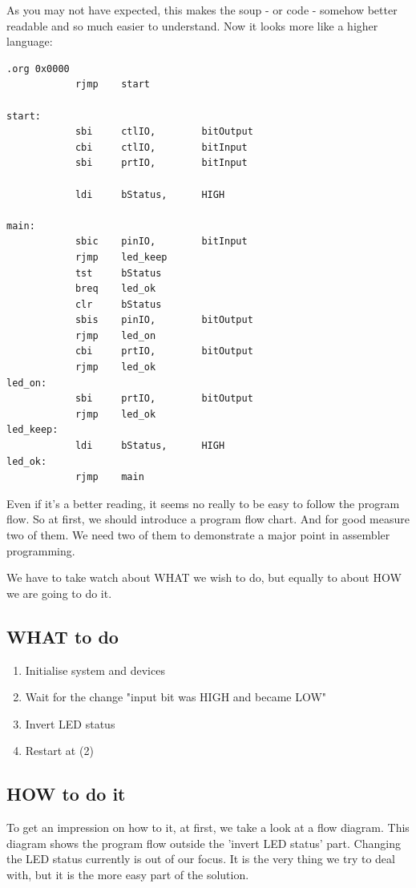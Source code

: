 As you may not have expected, this makes the soup - or code - somehow better readable and so much easier to understand. Now it looks more like a higher language:

\begin{lstlisting}
.org 0x0000
            rjmp    start

start:
            sbi     ctlIO,        bitOutput
            cbi     ctlIO,        bitInput
            sbi     prtIO,        bitInput

            ldi     bStatus,      HIGH

main:
            sbic    pinIO,        bitInput
            rjmp    led_keep
            tst     bStatus
            breq    led_ok
            clr     bStatus
            sbis    pinIO,        bitOutput
            rjmp    led_on
            cbi     prtIO,        bitOutput
            rjmp    led_ok
led_on:
            sbi     prtIO,        bitOutput
            rjmp    led_ok
led_keep:
            ldi     bStatus,      HIGH
led_ok:
            rjmp    main
\end{lstlisting}

Even if it's a better reading, it seems no really to be easy to follow the program flow. So at first, we should introduce a program flow chart. And for good measure two of them. We need two of them to demonstrate a major point in assembler programming.

We have to take watch about WHAT we wish to do, but equally to about HOW we are going to do it.

\subsection{WHAT to do}

\begin{enumerate}
  \item Initialise system and devices
  \item Wait for the change "input bit was HIGH and became LOW"
  \item Invert LED status
  \item Restart at (2)
\end{enumerate}


\subsection{HOW to do it}

To get an impression on how to it, at first, we take a look at a flow diagram. This diagram shows the program flow outside the 'invert LED status' part. Changing the LED status currently is out of our focus. It is the very thing we try to deal with, but it is the more easy part of the solution.


